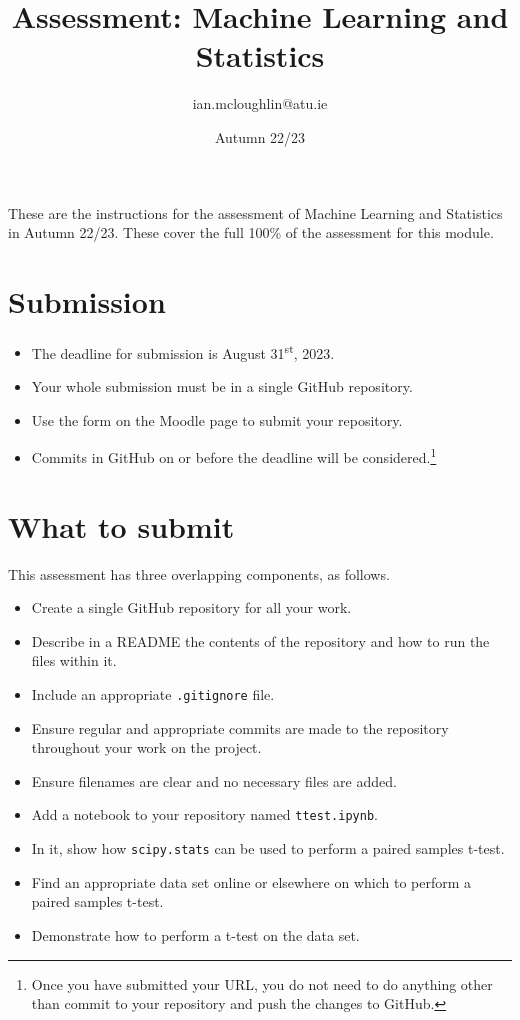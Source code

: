 \documentclass[a4paper]{tufte-handout}
\title{Assessment: Machine Learning and Statistics}
\author{ian.mcloughlin@atu.ie}
\date{Autumn 22/23}
\begin{document}
 
\maketitle

These are the instructions for the assessment of Machine Learning and Statistics in Autumn 22/23.
These cover the full 100\% of the assessment for this module.


\section{Submission}

\begin{itemize}
  \item The deadline for submission is August 31\textsuperscript{st}, 2023. 
  \item Your whole submission must be in a single GitHub repository.
  \item Use the form on the Moodle page to submit your repository.
  \item Commits in GitHub on or before the deadline will be considered.\footnote{Once you have submitted your URL, you do not need to do anything other than commit to your repository and push the changes to GitHub.}
\end{itemize}


\section{What to submit}
This assessment has three overlapping components, as follows.

\begin{itemize}
  \item Create a single GitHub repository for all your work.
  \item Describe in a README the contents of the repository and how to run the files within it.
  \item Include an appropriate \texttt{.gitignore} file.
  \item Ensure regular and appropriate commits are made to the repository throughout your work on the project.
  \item Ensure filenames are clear and no necessary files are added.
\end{itemize}

\begin{itemize}
  \item Add a notebook to your repository named \texttt{ttest.ipynb}.
  \item In it, show how \texttt{scipy.stats} can be used to perform a paired samples t-test.
  \item Find an appropriate data set online or elsewhere on which to perform a paired samples t-test.
  \item Demonstrate how to perform a t-test on the data set.
\end{itemize}
\end{document}

